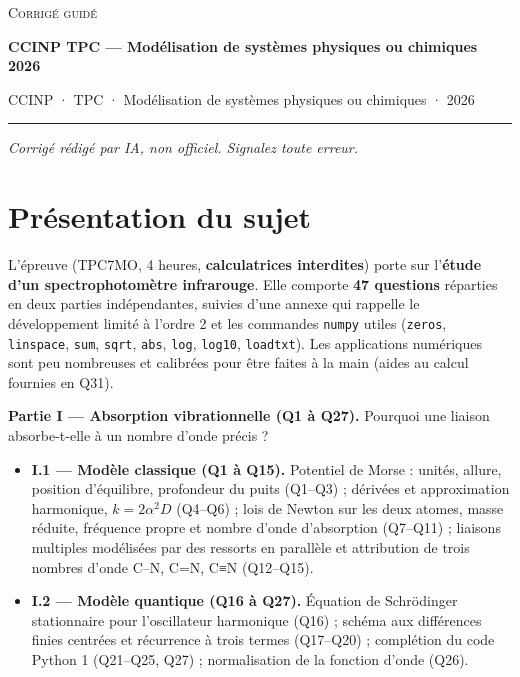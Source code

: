 \documentclass[11pt,a4paper]{article}
\providecommand{\tightlist}{\setlength{\itemsep}{0pt}\setlength{\parskip}{0pt}}
\begin{document}
\thispagestyle{plain}
\begin{center}
  {\small\scshape Corrigé guidé}\par\smallskip
  {\LARGE\bfseries CCINP TPC — Modélisation de systèmes physiques ou chimiques 2026\par}\medskip
  {\large CCINP · TPC · Modélisation de systèmes physiques ou chimiques · 2026\par}
\end{center}
\vspace{2pt}\hrule\vspace{8pt}

\emph{Corrigé rédigé par IA, non officiel. Signalez toute erreur.}

\hypertarget{pruxe9sentation-du-sujet}{%
\section{Présentation du sujet}\label{pruxe9sentation-du-sujet}}

L'épreuve (TPC7MO, 4 heures, \textbf{calculatrices interdites}) porte sur l'\textbf{étude d'un spectrophotomètre infrarouge}. Elle comporte \textbf{47 questions} réparties en deux parties indépendantes, suivies d'une annexe qui rappelle le développement limité à l'ordre 2 et les commandes \texttt{numpy} utiles (\texttt{zeros}, \texttt{linspace}, \texttt{sum}, \texttt{sqrt}, \texttt{abs}, \texttt{log}, \texttt{log10}, \texttt{loadtxt}). Les applications numériques sont peu nombreuses et calibrées pour être faites à la main (aides au calcul fournies en Q31).

\textbf{Partie I --- Absorption vibrationnelle (Q1 à Q27).} Pourquoi une liaison absorbe-t-elle à un nombre d'onde précis ?

\begin{itemize}
\tightlist
\item
  \textbf{I.1 --- Modèle classique (Q1 à Q15).} Potentiel de Morse : unités, allure, position d'équilibre, profondeur du puits (Q1--Q3) ; dérivées et approximation harmonique, \(k = 2\alpha^2 D\) (Q4--Q6) ; lois de Newton sur les deux atomes, masse réduite, fréquence propre et nombre d'onde d'absorption (Q7--Q11) ; liaisons multiples modélisées par des ressorts en parallèle et attribution de trois nombres d'onde C--N, C=N, C≡N (Q12--Q15).
\item
  \textbf{I.2 --- Modèle quantique (Q16 à Q27).} Équation de Schrödinger stationnaire pour l'oscillateur harmonique (Q16) ; schéma aux différences finies centrées et récurrence à trois termes (Q17--Q20) ; complétion du code Python 1 (Q21--Q25, Q27) ; normalisation de la fonction d'onde (Q26).
\end{itemize}
\end{document}
